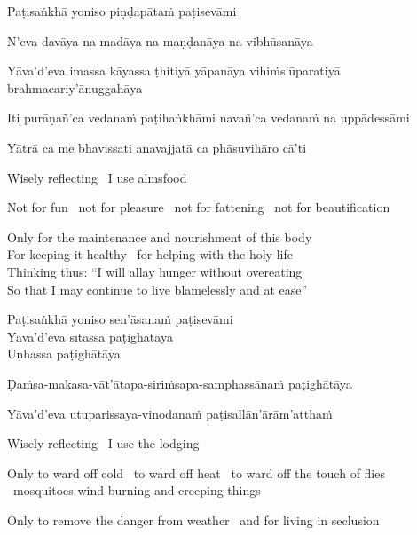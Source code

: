 Paṭisaṅkhā yoniso piṇḍapātaṁ paṭisevāmi\\
\begin{pali-hang-together}
N'eva davāya na madāya na maṇḍanāya na vibhūsanāya
\end{pali-hang-together}
\begin{pali-hang-together}
  Yāva'd'eva imassa kāyassa ṭhitiyā yāpanāya vihiṁs'ūparatiyā brahmacariy'ānuggahāya
\end{pali-hang-together}
\ifninebythirteen\clearpage\fi
\begin{pali-hang-together}
  Iti purāṇañ'ca vedanaṁ paṭihaṅkhāmi navañ'ca vedanaṁ na uppādessāmi
\end{pali-hang-together}
Yātrā ca me bhavissati anavajjatā ca phāsuvihāro cā'ti

\begin{english-keep-with}
  Wisely reflecting \breathmark\ I use almsfood
  \begin{english-hang-together}
    Not for fun \breathmark\ not for pleasure \breathmark\ not for fattening \breathmark\ not for beautification
  \end{english-hang-together}
  Only for the maintenance and nourishment of this body\\
  For keeping it healthy \breathmark\ for helping with the holy life\\
  Thinking thus: ``I will allay hunger without overeating\\
  So that I may continue to live blamelessly and at ease''
\end{english-keep-with}

\ifafive\clearpage\fi
\ifbfive\clearpage\fi

Paṭisaṅkhā yoniso sen'āsanaṁ paṭisevāmi\\
Yāva'd'eva sītassa paṭighātāya\\
Uṇhassa paṭighātāya\\
\begin{pali-hang-together}
Ḍaṁsa-makasa-vāt'ātapa-siriṁsapa-samphassānaṁ paṭighātāya\\
\end{pali-hang-together}
\begin{pali-hang-together}
Yāva'd'eva utuparissaya-vinodanaṁ paṭisallān'ārām'atthaṁ
\end{pali-hang-together}

\begin{english-keep-with}
  Wisely reflecting \breathmark\ I use the lodging
  \begin{english-hang-together}
    Only to ward off cold \breathmark\ to ward off heat \breathmark\ to ward off the touch of flies \breathmark\ mosquitoes wind burning and creeping things
  \end{english-hang-together}
  \begin{english-hang-together}
    Only to remove the danger from weather \breathmark\ and for living in seclusion
  \end{english-hang-together}
\end{english-keep-with}

